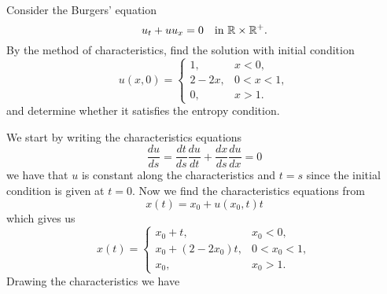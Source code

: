 \newpage
\begin{exercise}
    Consider the Burgers' equation
    \[
        u_t + u u_x = 0 \quad \text{in } \mathbb{R} \times \mathbb{R}^+.
    \]
    By the method of characteristics, find the solution with initial condition
    \[
        u(x,0) = \begin{cases}
            1,      & x < 0,     \\
            2 - 2x, & 0 < x < 1, \\
            0,      & x > 1.
        \end{cases}
    \]
    and determine whether it satisfies the entropy condition.
\end{exercise}
We start by writing the characteristics equations
\[
    \frac{du}{ds} = \frac{dt}{ds} \frac{du}{dt} + \frac{dx}{ds} \frac{du}{dx} = 0
\]
we have that \(u\) is constant along the characteristics and \(t=s\) since the
initial condition is given at \(t=0\). Now we find the characteristics
equations from
\[
    x(t) = x_0 + u(x_0, t) t
\]
which gives us
\[
    x(t) = \begin{cases}
        x_0 + t,           & x_0 < 0,     \\
        x_0 + (2 - 2x_0)t, & 0 < x_0 < 1, \\
        x_0,               & x_0 > 1.
    \end{cases}
\]
Drawing the characteristics we have

